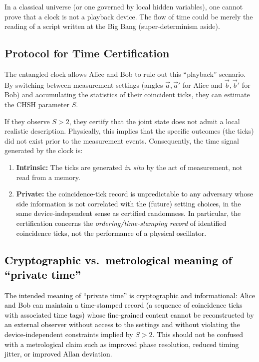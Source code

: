 \documentclass[reprint,aps,pra,longbibliography]{revtex4-2}
\newcommand{\rev}[1]{\textcolor{black}{#1}} %
\begin{document}
In a classical universe (or one governed by local hidden variables), one cannot prove that a clock is not a playback device. The flow of time could be merely the reading of a script written at the Big Bang (super-determinism aside).

\subsection{Protocol for Time Certification}
The entangled clock allows Alice and Bob to rule out this ``playback'' scenario. By switching between measurement settings (angles $\vec{a}, \vec{a}'$ for Alice and $\vec{b}, \vec{b}'$ for Bob) and accumulating the statistics of their coincident ticks, they can estimate the CHSH parameter $S$.

If they observe $S > 2$, they certify that the joint state does not admit a local realistic description. Physically, this implies that the specific outcomes (the ticks) did not exist prior to the measurement events.
Consequently, the time signal generated by the clock is:
\begin{enumerate}
    \item \textbf{Intrinsic:} The ticks are generated \emph{in situ} by the act of measurement, not read from a memory.
    \item \textbf{Private:} \rev{the coincidence-tick record is unpredictable to any adversary whose side information is not correlated with the (future) setting choices, in the same device-independent sense as certified randomness. In particular, the certification concerns the \emph{ordering/time-stamping record} of identified coincidence ticks, not the performance of a physical oscillator.}
\end{enumerate}

\rev{\subsection{Cryptographic vs.\ metrological meaning of ``private time''}}
\rev{The intended meaning of ``private time'' is cryptographic and informational: Alice and Bob can maintain a time-stamped record (a sequence of coincidence ticks with associated time tags) whose fine-grained content cannot be reconstructed by an external observer without access to the settings and without violating the device-independent constraints implied by $S>2$. This should not be confused with a metrological claim such as improved phase resolution, reduced timing jitter, or improved Allan deviation.}
\end{document}
